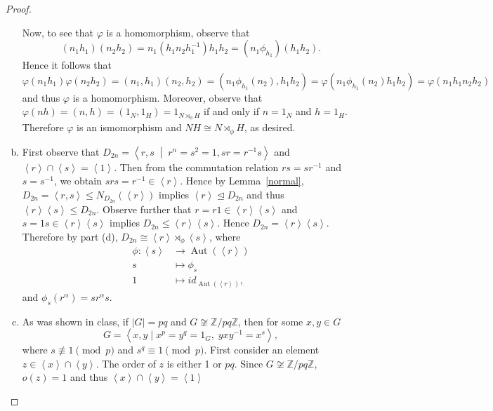 \documentclass[10pt]{amsart}
\newcommand{\Aut}[1]{\operatorname{Aut}\left(#1\right)}
\newcommand{\abs}[1]{\left| #1 \right|}
\begin{document}
\begin{thm}
\begin{proof}
\begin{enumerate}[(a)]
      Now, to see that $\varphi$ is a homomorphism, observe that 
      $$(n_1h_1)(n_2h_2) = n_1(h_1n_2h_1^{-1})h_1h_2 = (n_1\phi_{h_1})(h_1h_2).$$
      Hence it follows that
      $$\varphi(n_1h_1)\varphi(n_2h_2) = (n_1, h_1)(n_2,h_2) = (n_1\phi_{h_1}(n_2), h_1h_2) = \varphi(n_1\phi_{h_1}(n_2)h_1h_2) = \varphi(n_1h_1n_2h_2)$$
      and thus $\varphi$ is a homomorphism.
      Moreover, observe that $\varphi(nh) = (n,h) = (1_N,1_H) = 1_{N \rtimes_{\phi} H}$ if and only if $n = 1_N$ and $h = 1_H$.
      Therefore $\varphi$ is an ismomorphism and $NH \cong N \rtimes_{\phi} H$, as desired.
    \item
      First observe that $D_{2n} = \left< r, s \;\middle\vert\; r^n = s^2 = 1, sr = r^{-1}s\right>$ and $\left<r\right> \cap \left<s\right> = \left<1\right>$.
      Then from the commutation relation $rs = sr^{-1}$ and $s = s^{-1}$, we obtain $srs = r^{-1} \in \left<r\right>$.
      Hence by Lemma~\ref{normal}, $D_{2n} = \left<r, s\right> \leq N_{D_{2n}}(\left<r\right>)$ implies $\left<r\right> \unlhd D_{2n}$ and thus $\left<r\right>\left<s\right> \leq D_{2n}$.
      Observe further that $r = r1 \in \left<r\right>\left<s\right>$ and $s = 1s \in \left<r\right>\left<s\right>$ implies $D_{2n} \leq \left<r\right>\left<s\right>$.
      Hence $D_{2n} = \left<r\right>\left<s\right>$.
      Therefore by part (d), $D_{2n} \cong \left<r\right> \rtimes_{\phi} \left<s\right>$, where 
      \begin{align*}
        \phi \colon \left<s\right> &\rightarrow \Aut{\left<r\right>}\\
        s &\mapsto \phi_{s}\\ 
        1 &\mapsto id_{\Aut{\left<r\right>}},
      \end{align*}
      and $\phi_{s}(r^\alpha) = s r^\alpha s$.
    \item
      As was shown in class, if $\abs{G} = pq$ and $G \not \cong \mathbb{Z}/pq\mathbb{Z}$, then for some $x,y \in G$
      $$G = \left< x, y \mid x^p = y^q = 1_G,\; yxy^{-1} = x^s\right>,$$
      where $s \not \equiv 1 \pmod{p}$ and $s^q \equiv 1 \pmod{p}$.
      First consider an element $z \in \left<x\right> \cap \left<y\right>$.
      The order of $z$ is either 1 or $pq$.
      Since $G \not \cong \mathbb{Z}/pq\mathbb{Z}$, $o(z) = 1$ and thus $\left<x\right> \cap \left<y\right> = \left< 1 \right>$


\end{enumerate}
\end{proof}
\end{thm}
\end{document}
